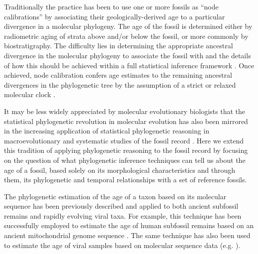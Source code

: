 \documentclass[11pt]{article}
\begin{document}
Traditionally the practice has been to use one or more fossils as ``node calibrations'' by associating their geologically-derived age to a particular divergence in a molecular phylogeny. The age of the fossil is determined either by radiometric aging of strata above and/or below the fossil, or more commonly by biostratigraphy. 
The difficulty lies in determining the appropriate ancestral divergence in the molecular phylogeny to associate the fossil with and the details of how this should be achieved within a full statistical inference framework \cite{Ho2009, Heled2012, HeledDrummond2015}.
Once achieved, node calibration confers age estimates to the remaining ancestral divergences in the phylogenetic tree by the assumption of a strict or relaxed molecular clock \cite{Thorne1998,thorne2005,yang2006,Drummond2006,drummond2010}. 

It may be less widely appreciated by molecular evolutionary biologists that the statistical phylogenetic revolution in molecular evolution has also been mirrored in the increasing application of statistical phylogenetic reasoning in macroevolutionary and systematic studies of the fossil record \cite{Foote1996,huelsenbeck1997maximum, tavare2002using, WagnerMarcot2013}. 
Here we extend this tradition of applying phylogenetic reasoning to the fossil record by focusing on the question of what phylogenetic inference techniques can tell us about the age of a fossil, based solely on its morphological characteristics and through them, its phylogenetic and temporal relationships with a set of reference fossils.


The phylogenetic estimation of the age of a taxon based on its molecular sequence has been previously described \cite{drummond2002computational,shapiro2011bayesian} and applied to both ancient subfossil remains and rapidly evolving viral taxa. 
For example, this technique has been successfully employed to estimate the age of human subfossil remains based on an ancient mitochondrial genome sequence \cite{meyer2014mitochondrial}. 
The same technique has also been used to estimate the age of viral samples based on molecular sequence data (e.g. \cite{gray2013evolutionary}).
\end{document}

